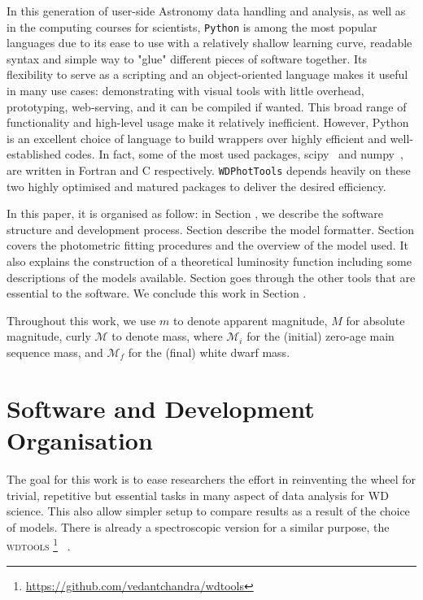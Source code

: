 \documentclass[fleqn,usenatbib]{rasti}
\begin{document}
In this generation of user-side Astronomy data handling and analysis, as well
as in the computing courses for scientists, \texttt{Python} is among the most
popular languages due to its ease to use with a relatively shallow learning
curve, readable syntax and simple way to "glue" different pieces of software
together. Its flexibility to serve as a scripting and an object-oriented
language makes it useful in many use cases: demonstrating with visual tools
with little overhead, prototyping, web-serving, and it can be compiled if
wanted. This broad range of functionality and high-level usage make it
relatively inefficient. However, Python is an excellent choice of language to
build wrappers over highly efficient and well-established codes. In fact,
some of the most used packages, scipy~\citep{2020NatMe..17..261V} and
numpy~\citep{2020Natur.585..357H}, are written in Fortran and C respectively.
\texttt{WDPhotTools} depends heavily on these two highly optimised and matured
packages to deliver the desired efficiency.

In this paper, it is organised as follow: in Section , we describe
the software structure and development process. Section  describe
the model formatter. Section  covers the photometric fitting
procedures and the overview of the model used. It also explains the
construction of a theoretical luminosity function including some descriptions
of the models available. Section  goes through the other tools
that are essential to the software. We conclude this work in Section
.

Throughout this work, we use $m$ to denote apparent magnitude, $M$ for
absolute magnitude, curly $\mathcal{M}$ to denote mass, where $\mathcal{M}_i$
for the (initial) zero-age main sequence mass, and $\mathcal{M}_f$ for the
(final) white dwarf mass.

\section{Software and Development Organisation}
The goal for this work is to ease researchers the effort in reinventing the
wheel for trivial, repetitive but essential tasks in many aspect of data
analysis for WD science. This also allow simpler setup to compare results as a
result of the choice of models. There is already a spectroscopic version
for a similar purpose, the \textsc{wdtools}
\footnote{\url{https://github.com/vedantchandra/wdtools}}~
\citep{2020MNRAS.497.2688C}.
\end{document}

